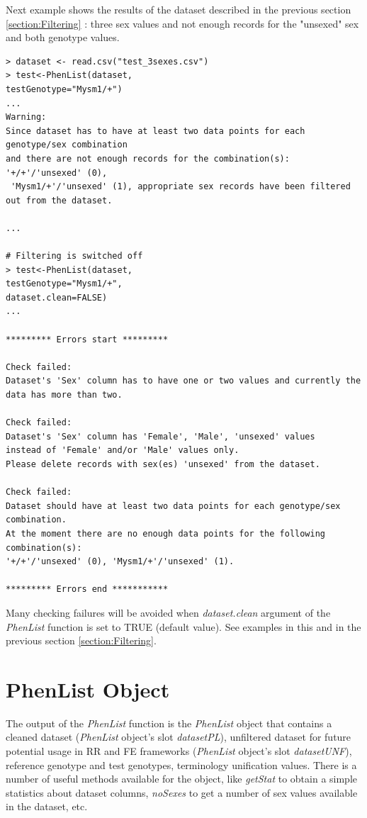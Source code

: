 \documentclass[12pt,a4paper]{article}
\begin{document}
Next example shows the results of the dataset described in the previous section \ref{section:Filtering} : three sex values and not enough records for the "unsexed" sex and both genotype values.

\begingroup
    \fontsize{8pt}{12pt}\selectfont
\begin{verbatim}
> dataset <- read.csv("test_3sexes.csv")
> test<-PhenList(dataset,
testGenotype="Mysm1/+")
...
Warning:
Since dataset has to have at least two data points for each genotype/sex combination 
and there are not enough records for the combination(s): '+/+'/'unsexed' (0),
 'Mysm1/+'/'unsexed' (1), appropriate sex records have been filtered out from the dataset.

...

# Filtering is switched off
> test<-PhenList(dataset,
testGenotype="Mysm1/+",
dataset.clean=FALSE)
...

********* Errors start *********

Check failed:
Dataset's 'Sex' column has to have one or two values and currently the data has more than two.

Check failed:
Dataset's 'Sex' column has 'Female', 'Male', 'unsexed' values 
instead of 'Female' and/or 'Male' values only. 
Please delete records with sex(es) 'unsexed' from the dataset.

Check failed:
Dataset should have at least two data points for each genotype/sex combination. 
At the moment there are no enough data points for the following combination(s): 
'+/+'/'unsexed' (0), 'Mysm1/+'/'unsexed' (1).

********* Errors end ***********

\end{verbatim}
\endgroup

Many checking failures will be avoided when \textit{dataset.clean} argument of the \textit{PhenList} function is set to TRUE (default value). See examples in this and in the previous section \ref{section:Filtering}.

\section{PhenList Object}
The output of the \textit{PhenList} function is the \textit{PhenList} object that contains a cleaned dataset (\textit{PhenList} object's slot \textit{datasetPL}), unfiltered dataset for future potential usage in RR and FE frameworks (\textit{PhenList} object's slot \textit{datasetUNF}), reference genotype and test genotypes, terminology unification values. There is a number of useful methods available for the object, like \textit{getStat} to obtain a simple statistics about dataset columns, \textit{noSexes} to get a number of sex values available in the dataset, etc.
\end{document}
